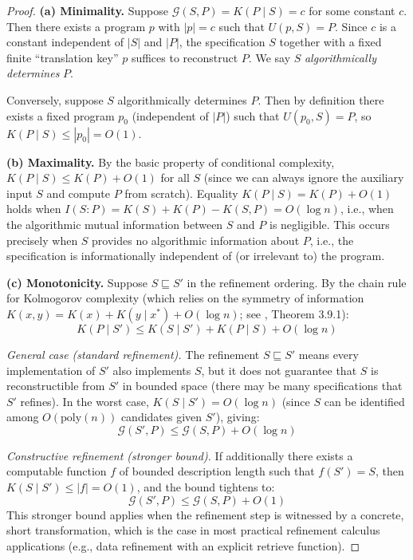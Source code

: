 \documentclass[11pt, a4paper, copyright]{googledeepmind}
\begin{document}
\begin{proof}
\textbf{(a) Minimality.} Suppose $\mathcal{G}(S, P) = K(P \mid S) = c$ for some constant $c$. Then there exists a program $p$ with $|p| = c$ such that $U(p, S) = P$. Since $c$ is a constant independent of $|S|$ and $|P|$, the specification $S$ together with a fixed finite ``translation key'' $p$ suffices to reconstruct $P$. We say $S$ \emph{algorithmically determines} $P$.

Conversely, suppose $S$ algorithmically determines $P$. Then by definition there exists a fixed program $p_0$ (independent of $|P|$) such that $U(p_0, S) = P$, so $K(P \mid S) \leq |p_0| = O(1)$.

\textbf{(b) Maximality.} By the basic property of conditional complexity, $K(P \mid S) \leq K(P) + O(1)$ for all $S$ (since we can always ignore the auxiliary input $S$ and compute $P$ from scratch). Equality $K(P \mid S) = K(P) + O(1)$ holds when $I(S : P) = K(S) + K(P) - K(S, P) = O(\log n)$, i.e., when the algorithmic mutual information between $S$ and $P$ is negligible. This occurs precisely when $S$ provides no algorithmic information about $P$, i.e., the specification is informationally independent of (or irrelevant to) the program.

\textbf{(c) Monotonicity.} Suppose $S \sqsubseteq S'$ in the refinement ordering. By the chain rule for Kolmogorov complexity (which relies on the symmetry of information $K(x, y) = K(x) + K(y \mid x^*) + O(\log n)$; see \citealp{li2019introduction}, Theorem 3.9.1):
\[
K(P \mid S') \leq K(S \mid S') + K(P \mid S) + O(\log n)
\]

\emph{General case (standard refinement).} The refinement $S \sqsubseteq S'$ means every implementation of $S'$ also implements $S$, but it does not guarantee that $S$ is reconstructible from $S'$ in bounded space (there may be many specifications that $S'$ refines). In the worst case, $K(S \mid S') = O(\log n)$ (since $S$ can be identified among $O(\text{poly}(n))$ candidates given $S'$), giving:
\[
\mathcal{G}(S', P) \leq \mathcal{G}(S, P) + O(\log n)
\]

\emph{Constructive refinement (stronger bound).} If additionally there exists a computable function $f$ of bounded description length such that $f(S') = S$, then $K(S \mid S') \leq |f| = O(1)$, and the bound tightens to:
\[
\mathcal{G}(S', P) \leq \mathcal{G}(S, P) + O(1)
\]
This stronger bound applies when the refinement step is witnessed by a concrete, short transformation, which is the case in most practical refinement calculus applications (e.g., data refinement with an explicit retrieve function).


\end{proof}
\end{document}
